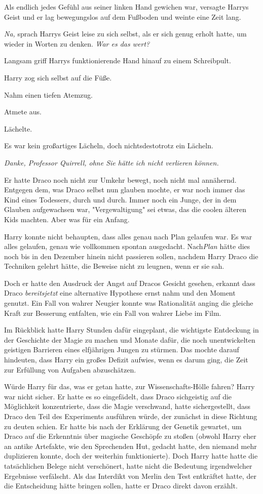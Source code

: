 {Als endlich jedes Gefühl aus seiner linken Hand gewichen war, versagte Harrys Geist und er lag bewegungslos auf dem Fußboden und weinte eine Zeit lang.

\emph{Na,} sprach Harrys Geist leise zu sich selbst, als er sich genug erholt hatte, um wieder in Worten zu denken. \emph{War es das wert?}

Langsam griff Harrys funktionierende Hand hinauf zu einem Schreibpult.

Harry zog sich selbst auf die Füße.

Nahm einen tiefen Atemzug.

Atmete aus.

Lächelte.

Es war kein großartiges Lächeln, doch nichtsdestotrotz ein Lächeln.

\emph{Danke, Professor Quirrell, ohne Sie hätte ich nicht verlieren können.}

Er hatte Draco noch nicht zur Umkehr bewegt, noch nicht mal annähernd. Entgegen dem, was Draco selbst nun glauben mochte, er war noch immer das Kind eines Todessers, durch und durch. Immer noch ein Junge, der in dem Glauben aufgewachsen war, "Vergewaltigung" sei etwas, das die coolen älteren Kids machten. Aber was für ein Anfang.

Harry konnte nicht behaupten, dass alles genau nach Plan gelaufen war. Es war alles gelaufen, genau wie vollkommen spontan ausgedacht. Nach\emph{Plan} hätte dies noch bis in den Dezember hinein nicht passieren sollen, nachdem Harry Draco die Techniken gelehrt hätte, die Beweise nicht zu leugnen, wenn er sie sah.

Doch er hatte den Ausdruck der Angst auf Dracos Gesicht gesehen, erkannt dass Draco \emph{bereitsjetzt} eine alternative Hypothese ernst nahm und den Moment genutzt. Ein Fall von wahrer Neugier konnte was Rationalität anging die gleiche Kraft zur Besserung entfalten, wie ein Fall von wahrer Liebe im Film.

Im Rückblick hatte Harry Stunden dafür eingeplant, die wichtigste Entdeckung in der Geschichte der Magie zu machen und Monate dafür, die noch unentwickelten geistigen Barrieren eines elfjährigen Jungen zu stürmen. Das mochte darauf hindeuten, dass Harry ein großes Defizit aufwies, wenn es darum ging, die Zeit zur Erfüllung von Aufgaben abzuschätzen.

Würde Harry für das, was er getan hatte, zur Wissenschafts-Hölle fahren? Harry war nicht sicher. Er hatte es so eingefädelt, dass Draco sichgeistig auf die Möglichkeit konzentrierte, dass die Magie verschwand, hatte sichergestellt, dass Draco den Teil des Experiments ausführen würde, der zunächst in diese Richtung zu deuten schien. Er hatte bis nach der Erklärung der Genetik gewartet, um Draco auf die Erkenntnis über magische Geschöpfe zu stoßen (obwohl Harry eher an antike Artefakte, wie den Sprechenden Hut, gedacht hatte, den niemand mehr duplizieren konnte, doch der weiterhin funktionierte). Doch Harry hatte hatte die tatsächlichen Belege nicht verschönert, hatte nicht die Bedeutung irgendwelcher Ergebnisse verfälscht. Als das Interdikt von Merlin den Test entkräftet hatte, der die Entscheidung hätte bringen sollen, hatte er Draco direkt davon erzählt.

}

